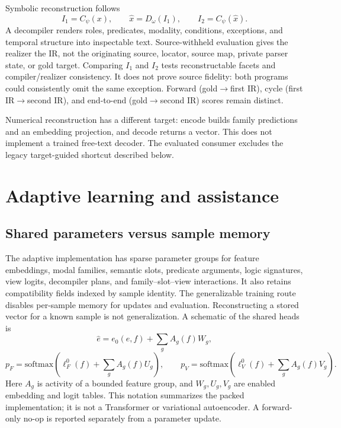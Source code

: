 \documentclass{article}
\begin{document}


Symbolic reconstruction follows
\begin{equation}
I_1=C_\psi(x),\qquad \hat{x}=D_\omega(I_1),\qquad I_2=C_\psi(\hat{x}).
\label{eq:cycle}
\end{equation}
A decompiler renders roles, predicates, modality, conditions, exceptions, and temporal structure into inspectable text. Source-withheld evaluation gives the realizer the IR, not the originating source, locator, source map, private parser state, or gold target. Comparing $I_1$ and $I_2$ tests reconstructable facets and compiler/realizer consistency. It does not prove source fidelity: both programs could consistently omit the same exception. Forward (gold$\to$first IR), cycle (first IR$\to$second IR), and end-to-end (gold$\to$second IR) scores remain distinct.

Numerical reconstruction has a different target: encode builds family predictions and an embedding projection, and decode returns a vector. This does not implement a trained free-text decoder. The evaluated consumer excludes the legacy target-guided shortcut described below.

\section{Adaptive learning and assistance}
\subsection{Shared parameters versus sample memory}
The adaptive implementation has sparse parameter groups for feature embeddings, modal families, semantic slots, predicate arguments, logic signatures, view logits, decompiler plans, and family--slot--view interactions. It also retains compatibility fields indexed by sample identity. The generalizable training route disables per-sample memory for updates and evaluation. Reconstructing a stored vector for a known sample is not generalization. A schematic of the shared heads is
\begin{equation}
\hat e=e_0(e,f)+\sum_g A_g(f)W_g,
\label{eq:emb}
\end{equation}
\begin{equation}
p_F=\mathrm{softmax}\!\left(\ell^0_F(f)+\sum_g A_g(f)U_g\right),\qquad
p_V=\mathrm{softmax}\!\left(\ell^0_V(f)+\sum_g A_g(f)V_g\right).
\label{eq:logits}
\end{equation}
Here $A_g$ is activity of a bounded feature group, and $W_g,U_g,V_g$ are enabled embedding and logit tables. This notation summarizes the packed implementation; it is not a Transformer or variational autoencoder. A forward-only no-op is reported separately from a parameter update.
\end{document}
